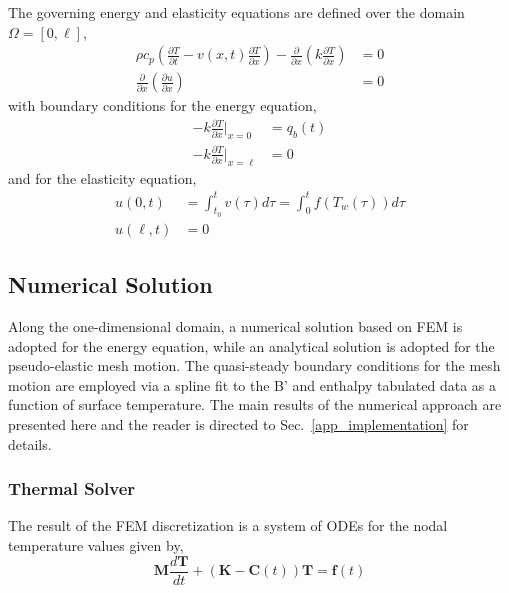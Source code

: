 The governing energy and elasticity equations are defined over the domain $\Omega=[0,\ell]$,
\begin{subequations}
    \begin{align}
        \rho c_p\left(\frac{\partial T}{\partial t} - v(x,t)\frac{\partial T}{\partial x}\right) - \frac{\partial}{\partial x}\left(k\frac{\partial T}{\partial x}\right) &= 0\label{eqn_thermal_1d}\\
        \frac{\partial}{\partial x}\left(\frac{\partial u}{\partial x}\right) &= 0\label{eqn_elasticity_1d}
    \end{align}\label{eqn_rpm}
\end{subequations}
with boundary conditions for the energy equation,
\begin{subequations}
    \begin{align}
        -k\frac{\partial T}{\partial x}\Bigg|_{x=0} &= q_b(t)\\
        -k\frac{\partial T}{\partial x}\Bigg|_{x=\ell} &= 0
    \end{align}
\end{subequations}
and for the elasticity equation,
\begin{subequations}
    \begin{align}
        u(0,t) &= \int_{t_0}^{t}v(\tau)d\tau = \int_{0}^{t} f(T_w(\tau))d\tau\\
        u(\ell,t) &= 0
    \end{align}
\end{subequations}

\subsection{Numerical Solution}

Along the one-dimensional domain, a numerical solution based on FEM is adopted for the energy equation, while an analytical solution is adopted for the pseudo-elastic mesh motion. The quasi-steady boundary conditions for the mesh motion are employed via a spline fit to the B' and enthalpy tabulated data as a function of surface temperature. The main results of the numerical approach are presented here and the reader is directed to Sec.~\ref{app_implementation} for details.

\subsubsection{Thermal Solver}

The result of the FEM discretization is a system of ODEs for the nodal temperature values given by,
\begin{equation}
    \mathbf{M}\frac{d\mathbf{T}}{dt} + \left(\mathbf{K} - \mathbf{C}(t)\right)\mathbf{T} = \mathbf{f}(t)
\end{equation}

